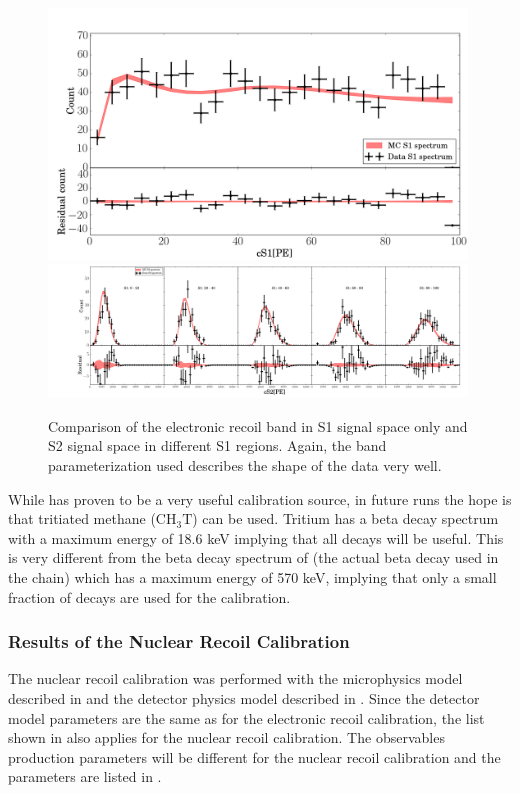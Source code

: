 	
\begin{figure}[t]
	\centering
	\includegraphics[width=0.99\textwidth]{xe1t_er_band_s1}
	\includegraphics[width=0.99\textwidth]{xe1t_er_band_s2}
	\caption{Comparison of the electronic recoil band in S1 signal space only and S2 signal space in different S1 regions.  Again, the band parameterization used describes the shape of the data very well.}
	\label{fig:xe1t_er_band_width_median}
\end{figure}

While  has proven to be a very useful calibration source, in future runs the hope is that tritiated methane ($\textrm{CH}_3\textrm{T}$) can be used.  Tritium has a beta decay spectrum with a maximum energy of 18.6 keV implying that all decays will be useful.  This is very different from the beta decay spectrum of  (the actual beta decay used in the  chain) which has a maximum energy of 570 keV, implying that only a small fraction of decays are used for the calibration.

\clearpage

\subsubsection{Results of the Nuclear Recoil Calibration}

The nuclear recoil calibration was performed with the microphysics model described in  and the detector physics model described in .  Since the detector model parameters are the same as for the electronic recoil calibration, the list shown in  also applies for the nuclear recoil calibration.  The observables production parameters will be different for the nuclear recoil calibration and the parameters are listed in .


